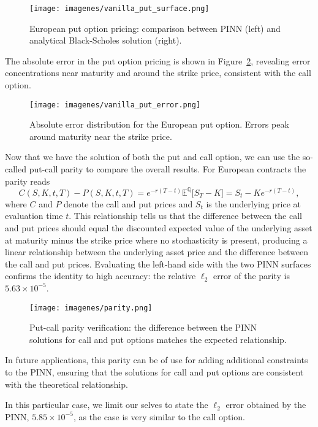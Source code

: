 \documentclass[12pt]{report} %
\theoremstyle{plain} %
\theoremstyle{definition} %
\theoremstyle{remark} %
\begin{document}
\begin{figure}[H]
	\centering
	\texttt{[image: imagenes/vanilla\_put\_surface.png]}
	\caption{European put option pricing: comparison between PINN (left) and analytical Black-Scholes solution (right).}
	\label{fig:put_option}
\end{figure}

The absolute error in the put option pricing is shown in 
Figure~\ref{fig:put_option_error}, revealing error concentrations near maturity 
and around the strike price, consistent with the call option.

\begin{figure}[H]
	\centering
	\texttt{[image: imagenes/vanilla\_put\_error.png]}
	\caption{Absolute error distribution for the European put option. Errors peak 
	around maturity near the strike price.}
	\label{fig:put_option_error}
\end{figure}

Now that we have the solution of both the put and call option, we can use the so-called put-call parity to
compare the overall results. For European contracts the parity reads
\[
C(S,K,t,T)-P(S,K,t,T)
   =
   e^{-r(T-t)}\mathbb{E}^{\mathbb{Q}}\bigl[S_T-K\bigr]
   =
   S_t-Ke^{-r(T-t)},
\]
where \(C\) and \(P\) denote the call and put prices and \(S_t\) is the underlying price at evaluation time $t$. This relationship
tells us that the difference between the call and put prices should equal the discounted 
expected value of the underlying asset at maturity minus the strike price where no stochasticity is present, producing a linear relationship 
between the underlying asset price and the difference between the call and put prices. Evaluating the left-hand side 
with the two PINN surfaces confirms the identity
to high accuracy: the relative \(\ell_2\) error of the parity is \(5.63\times10^{-5}\).

\begin{figure}
	\centering
	\texttt{[image: imagenes/parity.png]}
	\caption{Put-call parity verification: the difference between the PINN solutions for call and put options matches the expected relationship.}
	\label{fig:put_call_parity}
\end{figure}

In future applications, this parity can be of use for adding additional constraints to the PINN,
ensuring that the solutions for call and put options are consistent with the theoretical relationship.

In this particular case, we limit our selves to state the $\ell_2$ error obtained by the PINN, \(5.85\times10^{-5}\), as 
the case is very similar to the call option.
\end{document}
